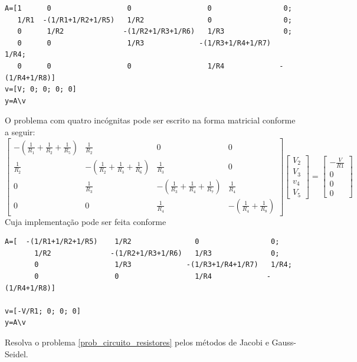 \begin{resp}
\begin{verbatim}
A=[1      0                  0                  0                 0;
   1/R1  -(1/R1+1/R2+1/R5)   1/R2               0                 0;
   0      1/R2              -(1/R2+1/R3+1/R6)   1/R3              0;
   0      0                  1/R3             -(1/R3+1/R4+1/R7)   1/R4;
   0      0                  0                  1/R4             -(1/R4+1/R8)]
v=[V; 0; 0; 0; 0]
y=A\v
\end{verbatim}
O problema com quatro incógnitas pode ser escrito na forma matricial conforme a seguir:
$$\left[\begin{array}{cccc}
-\left(\frac{1}{R_1}+\frac{1}{R_2}+\frac{1}{R_5}\right)&\frac{1}{R_2}&0&0\\[.5cm]
\frac{1}{R_2}&-\left(\frac{1}{R_2}+\frac{1}{R_3}+\frac{1}{R_6}\right)&\frac{1}{R_3}&0\\[.5cm]
0&\frac{1}{R_3}&-\left(\frac{1}{R_3}+\frac{1}{R_4}+\frac{1}{R_7}\right)&\frac{1}{R_4}\\[.5cm]
0&0&\frac{1}{R_4}&-\left(\frac{1}{R_4}+\frac{1}{R_8}\right)
\end{array}
\right]
\left[\begin{array}{c}
V_2\\[.65cm]
V_3\\[.65cm]
v_4\\[.65cm]
V_5
\end{array}
\right]=
\left[\begin{array}{c}
-\frac{V}{R1}\\[.65cm]
0\\[.65cm]
0\\[.65cm]
0
\end{array}
\right] $$
Cuja implementação pode ser feita conforme
\begin{verbatim}
A=[  -(1/R1+1/R2+1/R5)    1/R2               0                 0;
       1/R2              -(1/R2+1/R3+1/R6)   1/R3              0;
       0                  1/R3             -(1/R3+1/R4+1/R7)   1/R4;
       0                  0                  1/R4             -(1/R4+1/R8)]

v=[-V/R1; 0; 0; 0]
y=A\v
\end{verbatim}    
  
\end{resp}
\fi

\begin{exer} Resolva o problema \ref{prob_circuito_resistores} pelos métodos de Jacobi e Gauss-Seidel.
\end{exer}


